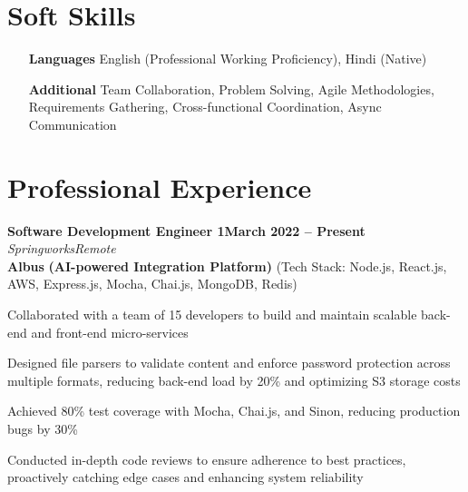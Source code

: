 \documentclass[letterpaper, 10pt]{article}
\newcommand{\heading}[2]{ \hspace{6pt}#1\hfill#2\\[0.8pt] }
\newcommand{\headingBf}[2]{ \heading{\textbf{#1}}{\textbf{#2}} }
\newcommand{\headingIt}[2]{ \heading{\textit{#1}}{\textit{#2}} }
\newenvironment{resume_list}{
\vspace{-5pt}
\begin{itemize}[itemsep=-3pt, parsep=0.2pt, leftmargin=20pt] }{ \end{itemize}
\vspace{-4pt}
}
\begin{document}
	\section{Soft Skills}
	\begin{itemize}[itemsep=-2pt, parsep=0.5pt, leftmargin=70pt]
		\item[\textbf{Languages}] English (Professional Working Proficiency), Hindi
			(Native)

		\item[\textbf{Additional}] Team Collaboration, Problem Solving, Agile Methodologies,
			Requirements Gathering, Cross-functional Coordination, Async Communication
	\end{itemize}

	\section{Professional Experience}
	\headingBf{Software Development Engineer 1}{March 2022 -- Present}
	\vspace{1pt}
	\headingIt{Springworks}{Remote}
	\vspace{2pt}
	\hspace{10pt}\textbf{Albus} \textbf{(AI-powered Integration Platform)} \small{(Tech Stack: Node.js, React.js, AWS, Express.js, Mocha, Chai.js, MongoDB, Redis)}
	\vspace{1pt}
	\begin{resume_list}
		\item Collaborated with a team of 15 developers to build and maintain scalable
		back-end and front-end micro-services \item Designed file parsers to validate
		content and enforce password protection across multiple formats, reducing
		back-end load by 20\% and optimizing S3 storage costs \item Achieved 80\%
		test coverage with Mocha, Chai.js, and Sinon, reducing production bugs by 30\%
		\item Conducted in-depth code reviews to ensure adherence to best practices,
		proactively catching edge cases and enhancing system reliability
	\end{resume_list}

	\vspace{2pt}
\end{document}
